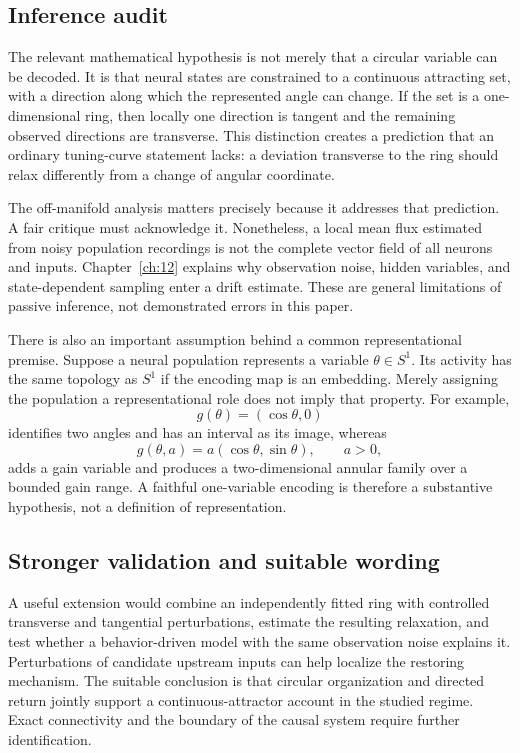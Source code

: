 \subsection{Inference audit}
The relevant mathematical hypothesis is not merely that a circular variable can be decoded. It is that neural states are constrained to a continuous attracting set, with a direction along which the represented angle can change. If the set is a one-dimensional ring, then locally one direction is tangent and the remaining observed directions are transverse. This distinction creates a prediction that an ordinary tuning-curve statement lacks: a deviation transverse to the ring should relax differently from a change of angular coordinate.

The off-manifold analysis matters precisely because it addresses that prediction. A fair critique must acknowledge it. Nonetheless, a local mean flux estimated from noisy population recordings is not the complete vector field of all neurons and inputs. Chapter~\ref{ch:12} explains why observation noise, hidden variables, and state-dependent sampling enter a drift estimate. These are general limitations of passive inference, not demonstrated errors in this paper.

There is also an important assumption behind a common representational premise. Suppose a neural population represents a variable \(\theta\in S^1\). Its activity has the same topology as \(S^1\) if the encoding map is an embedding. Merely assigning the population a representational role does not imply that property. For example,
\[
g(\theta)=(\cos\theta,0)
\]
identifies two angles and has an interval as its image, whereas
\[
g(\theta,a)=a(\cos\theta,\sin\theta),\qquad a>0,
\]
adds a gain variable and produces a two-dimensional annular family over a bounded gain range. A faithful one-variable encoding is therefore a substantive hypothesis, not a definition of representation.

\subsection{Stronger validation and suitable wording}
A useful extension would combine an independently fitted ring with controlled transverse and tangential perturbations, estimate the resulting relaxation, and test whether a behavior-driven model with the same observation noise explains it. Perturbations of candidate upstream inputs can help localize the restoring mechanism. The suitable conclusion is that circular organization and directed return jointly support a continuous-attractor account in the studied regime. Exact connectivity and the boundary of the causal system require further identification.

